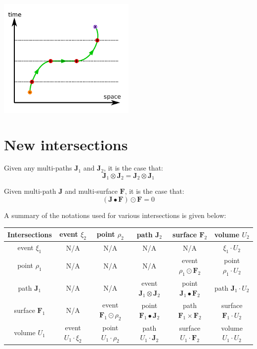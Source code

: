 \includegraphics[width = 0.5\textwidth]{Time/infinitely_fast_point}




\section{New intersections}  


\begin{thm}
Given any multi-paths \(\mathbf{J}_1\) and \(\mathbf{J}_2\), it is the case that:
\[\mathbf{J}_1 \otimes \mathbf{J}_2 = \mathbf{J}_2 \otimes \mathbf{J}_1\]
\end{thm}


\begin{thm}
Given multi-path \(\mathbf{J}\) and multi-surface \(\mathbf{F}\), it is the case that: 
\[(\mathbf{J} \bullet \mathbf{F}) \odot \mathbf{F} = 0\]
\end{thm}


A summary of the notations used for various intersections is given below:

\vspace{5mm}

\begin{tabular}{|c||c|c|c|c|c|}
\hline
Intersections & event \(\xi_2\) & point \(\rho_2\) & path \(\mathbf{J}_2\) & surface \(\mathbf{F}_2\) & volume \(U_2\) \\
\hline
\hline
event \(\xi_1\) & 
N/A & 
N/A & 
N/A & 
N/A & 
\(\xi_1 \cdot U_2\) \\
\hline
point \(\rho_1\) & 
N/A & 
N/A & 
N/A & 
event \(\rho_1 \odot \mathbf{F}_2\) & 
point \(\rho_1 \cdot U_2\) \\ 
\hline
path \(\mathbf{J}_1\) & 
N/A & 
N/A & 
event \(\mathbf{J}_1 \otimes \mathbf{J}_2\) & 
point \(\mathbf{J}_1 \bullet \mathbf{F}_2\) & 
path \(\mathbf{J}_1 \cdot U_2\) \\ 
\hline
surface \(\mathbf{F}_1\) & 
N/A & 
event \(\mathbf{F}_1 \odot \rho_2\) &
point \(\mathbf{F}_1 \bullet \mathbf{J}_2\) & 
path \(\mathbf{F}_1 \times \mathbf{F}_2\) & 
surface \(\mathbf{F}_1 \cdot U_2\) \\ 
\hline
volume \(U_1\) & 
event \(U_1 \cdot \xi_2\) & 
point \(U_1 \cdot \rho_2\) & 
path \(U_1 \cdot \mathbf{J}_2\) & 
surface \(U_1 \cdot \mathbf{F}_2\) & 
volume \(U_1 \cdot U_2\) \\
\hline
\end{tabular}


